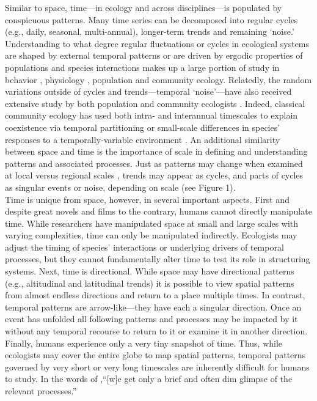 \documentclass[11pt,a4paper,oneside]{article}
\begin{document}
Similar to space, time---in ecology and across disciplines---is populated by conspicuous patterns. Many time series can be decomposed into regular cycles (e.g., daily, seasonal, multi-annual), longer-term trends and remaining `noise.'  Understanding to what degree regular fluctuations or cycles in ecological systems are shaped by external temporal patterns or are driven by ergodic properties of populations and species interactions makes up a large portion of study in behavior \citep{macarthur1958}, physiology \citep{Lambers:2008jb}, population  \citep{May1976,Gurney1985,Krebs2001,Yang:2004zd} and community \citep{Chesson:1997dz} ecology.  Relatedly, the random variations outside of cycles and trends---temporal `noise'---have also received extensive study by both population \citep{Ripa1996,Kaitala1997,Bjornstad:1999kl} and community ecologists \citep{Chesson:2000vd}. Indeed, classical community ecology has used both intra- \citep{parrish1979,Albrecht:2001id} and interannual \citep{Chesson:1997dz} timescales to explain coexistence via temporal partitioning or small-scale differences in species' responses to a temporally-variable environment \citep{macarthur1958,Hutchinson:1961ui}. An additional similarity between space and time is the importance of scale in defining and understanding patterns and associated processes. Just as patterns may change when examined at local versus regional scales \citep[e.g.,][]{Fridley:2007ct}, trends may appear as cycles, and parts of cycles as singular events or noise, depending on scale (see Figure 1). \\

Time is unique from space, however, in several important aspects. First and despite great novels and films to the contrary, humans cannot directly manipulate time. While researchers have manipulated space at small \citep[e.g.,][]{huffaker} and large \citep[e.g.,][]{Terborgh:2001bw} scales with varying complexities, time can only be manipulated indirectly. Ecologists may adjust the timing of species' interactions \citep{Yang:2010cq} or underlying drivers of temporal processes, but they cannot fundamentally alter time to test its role in structuring systems. Next, time is directional. While space may have directional patterns (e.g., altitudinal and latitudinal trends) it is possible to view spatial patterns from almost endless directions and return to a place multiple times. In contrast, temporal patterns are arrow-like---they have each a singular direction. Once an event has unfolded all following patterns and processes may be impacted by it without any temporal recourse to return to it or examine it in another direction. Finally, humans experience only a very tiny snapshot of time. Thus, while ecologists may cover the entire globe to map spatial patterns, temporal patterns governed by very short or very long timescales are inherently difficult for humans to study. In the words of \citet{wiens1986},``[w]e get only a brief and often dim glimpse of the relevant processes.'' \\
\end{document}
